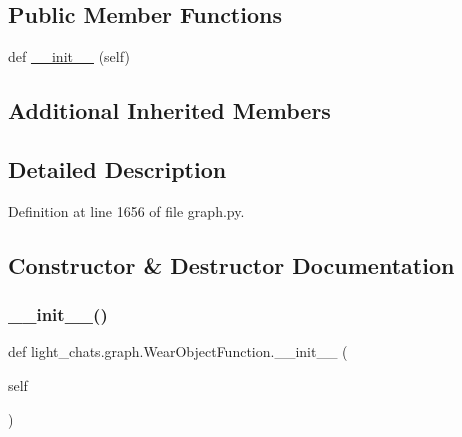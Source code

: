 \subsection*{Public Member Functions}
\begin{DoxyCompactItemize}
\item 
def \hyperlink{classlight__chats_1_1graph_1_1WearObjectFunction_a15f5038591492a7bd7796b664ff94847}{\+\_\+\+\_\+init\+\_\+\+\_\+} (self)
\end{DoxyCompactItemize}
\subsection*{Additional Inherited Members}


\subsection{Detailed Description}
\begin{DoxyVerb}
\end{DoxyVerb}
 

Definition at line 1656 of file graph.\+py.



\subsection{Constructor \& Destructor Documentation}
\mbox{\label{classlight__chats_1_1graph_1_1WearObjectFunction_a15f5038591492a7bd7796b664ff94847}} 
\subsubsection{\texorpdfstring{\+\_\+\+\_\+init\+\_\+\+\_\+()}{\_\_init\_\_()}}
{\footnotesize\ttfamily def light\+\_\+chats.\+graph.\+Wear\+Object\+Function.\+\_\+\+\_\+init\+\_\+\+\_\+ (\begin{DoxyParamCaption}\item[{}]{self }\end{DoxyParamCaption})}



